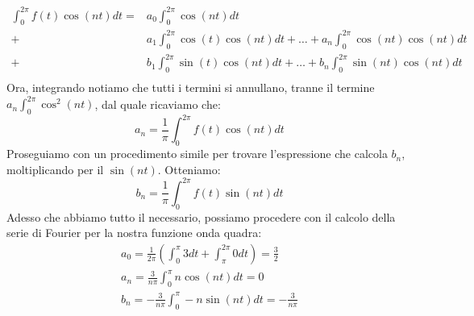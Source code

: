 \documentclass[a4paper, titlepage, oneside]{scrbook}
\begin{document}
\begin{align*}
\int_{0}^{2\pi}f(t)\cos(nt)dt=&a_0\int_{0}^{2\pi}\cos(nt)dt\\
							 +&a_1\int_{0}^{2\pi}\cos(t)\cos(nt)dt+\dots+a_n\int_{0}^{2\pi}\cos(nt)\cos(nt)dt\\
							 +&b_1\int_{0}^{2\pi}\sin(t)\cos(nt)dt+\dots+b_n\int_{0}^{2\pi}\sin(nt)\cos(nt)dt\\
\end{align*}
Ora, integrando notiamo che tutti i termini si annullano, tranne il termine $a_n\int_{0}^{2\pi}\cos^2(nt)$, dal quale ricaviamo che:
\begin{equation*}
	a_n=\frac{1}{\pi}\int_{0}^{2\pi}f(t)\cos(nt)dt
\end{equation*}
Proseguiamo con un procedimento simile per trovare l'espressione che calcola $b_n$, moltiplicando per il $\sin(nt)$. Otteniamo:
\begin{equation*}
	b_n=\frac{1}{\pi}\int_{0}^{2\pi}f(t)\sin(nt)dt
\end{equation*}
Adesso che abbiamo tutto il necessario, possiamo procedere con il calcolo della serie di Fourier per la nostra funzione onda quadra:
\begin{align*}
	a_0=\frac{1}{2\pi}\left(\int_{0}^{\pi}3dt+\int_{\pi}^{2\pi}0dt\right)=\frac{3}{2}\\
	a_n=\frac{3}{n\pi}\int_{0}^{\pi}n\cos(nt)dt=0\\
	b_n=-\frac{3}{n\pi}\int_{0}^{\pi}-n\sin(nt)dt=-\frac{3}{n\pi}
\end{align*}
\end{document}
